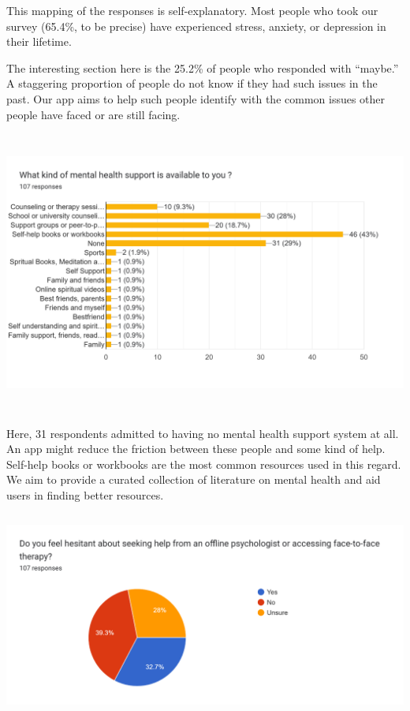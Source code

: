 \documentclass[manuscript,screen,review]{acmart}
\begin{document}
This mapping of the responses is self-explanatory. Most people who took
our survey (65.4\%, to be precise) have experienced stress, anxiety, or
depression in their lifetime.

The interesting section here is the 25.2\% of people who responded with
``maybe.'' A staggering proportion of people do not know if they had
such issues in the past. Our app aims to help such people identify with
the common issues other people have faced or are still facing.

\includegraphics[width=6.26806in,height=3.66458in]{vertopal.com_Survey analysis/vertopal_0d4ab446a1ae41f4824d7f0aaede9ca1/media/image5.png}

Here, 31 respondents admitted to having no mental health support system
at all. An app might reduce the friction between these people and some
kind of help. Self-help books or workbooks are the most common resources
used in this regard. We aim to provide a curated collection of
literature on mental health and aid users in finding better resources.

\includegraphics[width=5.84259in,height=2.64943in]{vertopal.com_Survey analysis/vertopal_0d4ab446a1ae41f4824d7f0aaede9ca1/media/image6.png}
\end{document}
